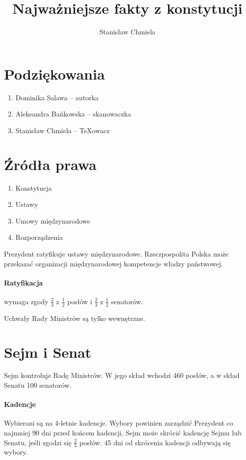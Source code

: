 \documentclass [a4paper, 12pt, oneside]{article}
\author{Stanisław Chmiela}
\title{Najważniejsze fakty z konstytucji}
\begin{document}
\section{Podziękowania}
\begin{enumerate}
    \item Dominika Salawa -- autorka
    \item Aleksandra Bańkowska -- skanowaczka
    \item Stanisław Chmiela -- \TeX owacz
\end{enumerate}
\clearpage
\section{Źródła prawa} %
\label{sec:_r_d_a_prawa}
    \begin{enumerate}
        \item Konstytucja
        \item Ustawy
        \item Umowy międzynarodowe
        \item Rozporządzenia
    \end{enumerate}
    Prezydent ratyfikuje ustawy międzynarodowe. Rzeczpospolita Polska może przekazać organizacji międzynarodowej kompetencje władzy państwowej.

    \paragraph{Ratyfikacja} wymaga zgody $\frac23$ z $\frac12$ posłów i $\frac23$ z $\frac12$ senatorów.

    Uchwały Rady Ministrów są tylko wewnętrzne.

\section{Sejm i Senat} %
\label{sec:sejm_i_senat}
    Sejm kontroluje Radę Ministrów. W jego skład wchodzi 460 posłów, a w skład Senatu 100 senatorów.

    \paragraph{Kadencje} Wybierani są na 4-letnie kadencje. Wybory powinien zarządzić Prezydent co najmniej 90 dni przed końcem kadencji. Sejm może skrócić kadencję Sejmu lub Senatu, jeśli zgodzi się $\frac23$ posłów. 45 dni od skrócenia kadencji odbywają się wybory.
\end{document}
